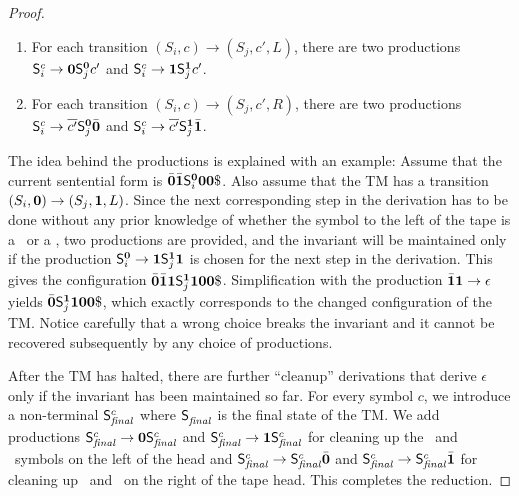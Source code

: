 \documentclass[9pt,preprint,nonatbib]{sigplanconf}
\begin{document}
\begin{proof}
\begin{enumerate}
\item For each transition  $(S_i, c) \rightarrow (S_j,c',L)$, there are
  two  productions $\mathsf{S}_{i}^{c}  \rightarrow  \mathbf{0} \mathsf{S}_{j}^{\mathbf{0}}c'$
  and $\mathsf{S}_{i}^{c} \rightarrow \mathbf{1} \mathsf{S}_{j}^{\mathbf{1}}c'$.
\item For each  transition $(S_i, c) \rightarrow (S_j,c',R)$, there
  are two productions
  $\mathsf{S}_{i}^{c} \rightarrow \overline{c'} \mathsf{S}_{j}^{\mathbf{0}}\bar{\mathbf{0}}$ and $\mathsf{S}_{i}^{c}
  \rightarrow \overline{c'} \mathsf{S}_{j}^{\mathbf{1}}\bar{\mathbf{1}}$. 
\end{enumerate}
The idea  behind the  productions is explained  with an
example:  Assume that  the current  sentential form  is
$\bcar\bcdr\nont{i}{\acar}\acar\acar\$$. Also  assume that  the
TM  has  a   transition  $(S_i,\mathbf{0})  \rightarrow
(S_j,\mathbf{1}, L)$.  Since the next corresponding  step in
the  derivation  has  to  be  done  without  any  prior
knowledge of whether the symbol to the left of the tape
is a \acar\  or a \acdr, two  productions are provided,
and  the  invariant  will  be maintained  only  if  the
production         $\mathsf{S}_{i}^{\mathbf{0}}         \rightarrow
\mathbf{1}\mathsf{S}_{j}^{\mathbf{1}}\mathbf{1}$ is chosen  for the next step
in  the  derivation.    This  gives  the  configuration
$\bcar\bcdr\acdr\nont{j}{\acdr}\acdr\acar\acar\$$.
Simplification   with    the   production   $\bar{\mathbf{1}}\mathbf{1}
\rightarrow               \epsilon$              yields
$\bcar\nont{j}{\acdr}\acdr\acar\acar\$$,    which   exactly
corresponds  to   the  changed  configuration   of  the
TM.  Notice  carefully that a wrong  choice breaks
the invariant  and it cannot be  recovered subsequently
by any choice of productions.

After the  TM has  halted, there  are further  ``cleanup'' derivations
that derive  $\epsilon$ only if  the invariant has been  maintained so
far.    For   every   symbol   $c$,  we   introduce   a   non-terminal
$\mathsf{S}_{\mathit{final}}^{c}$  where   $\mathsf{S}_{\mathit{final}}^{}$  is  the
final state  of the  TM. We add  productions $\mathsf{S}_{\mathit{final}}^{c}
\rightarrow         \mathbf{0}        \mathsf{S}_{\mathit{final}}^{c}$         and
$\mathsf{S}_{\mathit{final}}^{c} \rightarrow  \mathbf{1} \mathsf{S}_{\mathit{final}}^{c}$
for cleaning up the \bcar\ and \bcdr\  symbols on the left of the head
and                $\mathsf{S}_{\mathit{final}}^{c}               \rightarrow
\mathsf{S}_{\mathit{final}}^{c}\bar{\mathbf{0}}$      and      $\mathsf{S}_{\mathit{final}}^{c}
\rightarrow \mathsf{S}_{\mathit{final}}^{c}\bar{\mathbf{1}}$ for  cleaning up \acar\ and
\acdr\ on the right of the tape head.  This completes the
reduction.\!
\end{proof}
\end{document}

